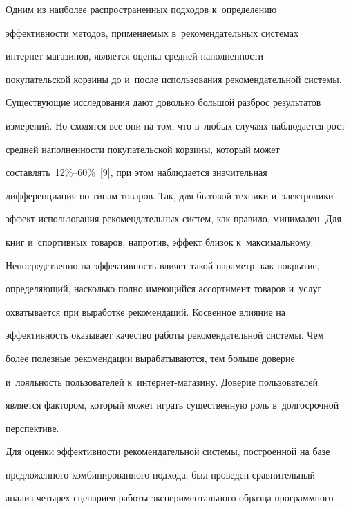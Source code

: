 \vspace*{-2pt}





  Одним из наиболее распространенных подходов к~определению 


эффективности методов, применяемых в~рекомендательных системах  


ин\-тер\-нет-ма\-га\-зи\-нов, является оценка средней наполненности 


покупательской корзины до и~после использования рекомендательной системы. 


Существующие исследования дают довольно большой разброс результатов 


измерений. Но сходятся все они на том, что в~любых случаях наблюдается рост 


средней наполненности покупательской корзины, который может 


составлять~12\%--60\%~[9], при этом наблюдается значительная 


дифференциация по типам товаров. Так, для бытовой техники и~электроники 


эффект использования рекомендательных систем, как правило, минимален. Для 


книг и~спортивных товаров, напротив, эффект близок к~максимальному. 


Непосредственно на эффективность влияет такой параметр, как покрытие, 


определяющий, насколько полно имеющийся ассортимент товаров и~услуг 


охватывается при выработке рекомендаций. Косвенное влияние на 


эффективность оказывает качество работы рекомендательной системы. Чем 


более полезные рекомендации вырабатываются, тем больше доверие 


и~лояльность пользователей к~интернет-магазину. Доверие пользователей 


является фактором, который может играть существенную роль в~долгосрочной 


перспективе. 


  


  Для оценки эффективности рекомендательной системы, построенной на базе 


предложенного комбинированного подхода, был проведен сравнительный 


анализ четырех сценариев работы экспериментального образца программного 


